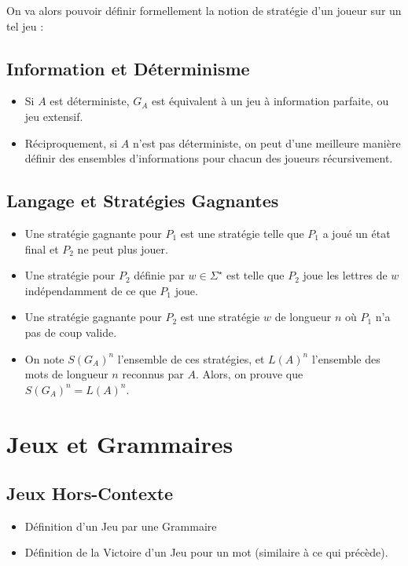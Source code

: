 \documentclass{cours}
\begin{document}
On va alors pouvoir définir formellement la notion de stratégie d'un joueur sur un tel jeu : 
\subsection{Information et Déterminisme}
\begin{itemize}
    \item Si $A$ est déterministe, $G_{A}$ est équivalent à un jeu à information parfaite, ou jeu extensif.
    \item Réciproquement, si $A$ n'est pas déterministe, on peut d'une meilleure manière définir des ensembles d'informations pour chacun des joueurs récursivement.
\end{itemize}

\subsection{Langage et Stratégies Gagnantes}
\begin{itemize}
    \item Une stratégie gagnante pour $P_{1}$ est une stratégie telle que $P_{1}$ a joué un état final et $P_{2}$ ne peut plus jouer.
    \item Une stratégie pour $P_{2}$ définie par $w \in \Sigma^{\star}$ est telle que $P_{2}$ joue les lettres de $w$ indépendamment de ce que $P_{1}$ joue.
    \item Une stratégie gagnante pour $P_{2}$ est une stratégie $w$ de longueur $n$ où $P_{1}$ n'a pas de coup valide.
    \item On note $S(G_{A})^{n}$ l'ensemble de ces stratégies, et $L(A)^{n}$ l'ensemble des mots de longueur $n$ reconnus par $A$. Alors, on prouve que $S(G_{A})^{n} = L(A)^{n}$.
\end{itemize}

\section{Jeux et Grammaires}
\subsection{Jeux Hors-Contexte}
\begin{itemize}
    \item Définition d'un Jeu par une Grammaire
    \item Définition de la Victoire d'un Jeu pour un mot (similaire à ce qui précède).
\end{itemize}
\end{document}
